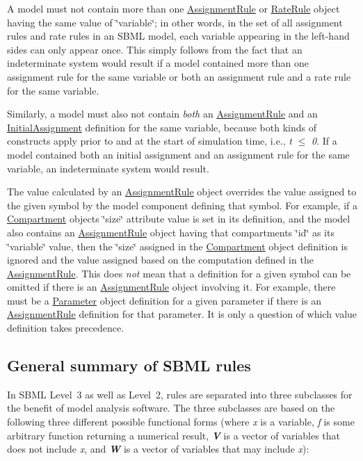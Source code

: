 A model must not contain more than one \hyperlink{class_assignment_rule}{Assignment\+Rule} or \hyperlink{class_rate_rule}{Rate\+Rule} object having the same value of \char`\"{}variable\char`\"{}; in other words, in the set of all assignment rules and rate rules in an S\+B\+ML model, each variable appearing in the left-\/hand sides can only appear once. This simply follows from the fact that an indeterminate system would result if a model contained more than one assignment rule for the same variable or both an assignment rule and a rate rule for the same variable.

Similarly, a model must also not contain {\itshape both} an \hyperlink{class_assignment_rule}{Assignment\+Rule} and an \hyperlink{class_initial_assignment}{Initial\+Assignment} definition for the same variable, because both kinds of constructs apply prior to and at the start of simulation time, i.\+e., {\itshape t} $\leq$ {\itshape 0}. If a model contained both an initial assignment and an assignment rule for the same variable, an indeterminate system would result.

The value calculated by an \hyperlink{class_assignment_rule}{Assignment\+Rule} object overrides the value assigned to the given symbol by the model component defining that symbol. For example, if a \hyperlink{class_compartment}{Compartment} object\textquotesingle{}s \char`\"{}size\char`\"{} attribute value is set in its definition, and the model also contains an \hyperlink{class_assignment_rule}{Assignment\+Rule} object having that compartment\textquotesingle{}s \char`\"{}id\char`\"{} as its \char`\"{}variable\char`\"{} value, then the \char`\"{}size\char`\"{} assigned in the \hyperlink{class_compartment}{Compartment} object definition is ignored and the value assigned based on the computation defined in the \hyperlink{class_assignment_rule}{Assignment\+Rule}. This does {\itshape not} mean that a definition for a given symbol can be omitted if there is an \hyperlink{class_assignment_rule}{Assignment\+Rule} object involving it. For example, there must be a \hyperlink{class_parameter}{Parameter} object definition for a given parameter if there is an \hyperlink{class_assignment_rule}{Assignment\+Rule} definition for that parameter. It is only a question of which value definition takes precedence.\hypertarget{classdoc__rules__general__summary_rules-general}{}\subsection{General summary of S\+B\+M\+L rules}\label{classdoc__rules__general__summary_rules-general}
In S\+B\+ML Level~3 as well as Level~2, rules are separated into three subclasses for the benefit of model analysis software. The three subclasses are based on the following three different possible functional forms (where {\itshape x} is a variable, {\itshape f} is some arbitrary function returning a numerical result, {\bfseries {\itshape V}} is a vector of variables that does not include {\itshape x}, and {\bfseries {\itshape W}} is a vector of variables that may include {\itshape x})\+:

